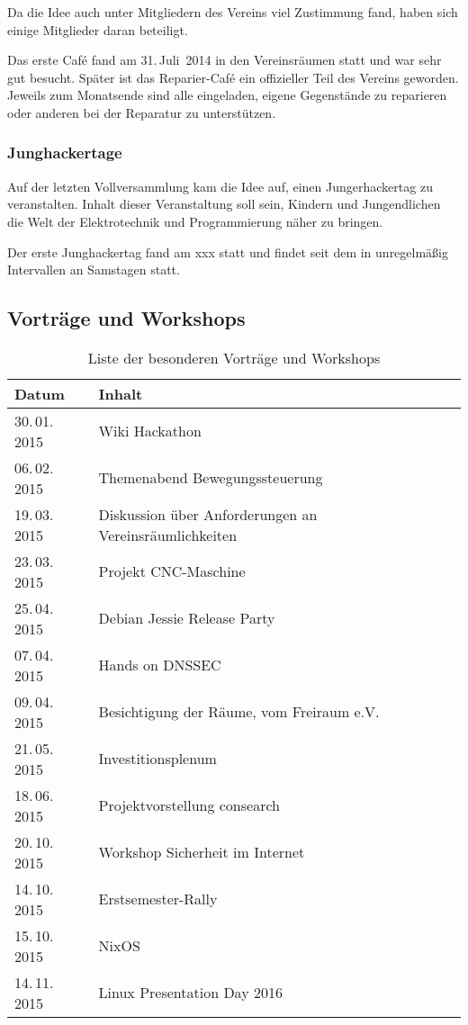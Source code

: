 \documentclass[ngerman]{scrartcl}
\begin{document}
Da die Idee auch unter Mitgliedern des Vereins viel Zustimmung fand,
haben sich einige Mitglieder daran beteiligt.

Das erste Café fand am 31.\,Juli~2014 in den Vereinsräumen statt und
war sehr gut besucht.  Später ist das Reparier-Café ein offizieller
Teil des Vereins geworden. Jeweils zum Monatsende sind alle
eingeladen, eigene Gegenstände zu reparieren oder anderen bei der
Reparatur zu unterstützen.

\subsubsection{Junghackertage}

Auf der letzten Vollversammlung kam die Idee auf, einen
Jungerhackertag zu veranstalten. Inhalt dieser Veranstaltung soll
sein, Kindern und Jungendlichen die Welt der Elektrotechnik und
Programmierung näher zu bringen.

Der erste Junghackertag fand am xxx statt und findet seit dem in
unregelmäßig Intervallen an Samstagen statt.


\subsection{Vorträge und Workshops}

\begin{table}[h]
  \centering{}
  \begin{tabularx}{\textwidth}{l|X}
	\textbf{Datum} & \textbf{Inhalt} \\ \midrule
	30.\,01.\,2015 & Wiki Hackathon \\
        06.\,02.\,2015 & Themenabend Bewegungssteuerung \\
	19.\,03.\,2015 & Diskussion über Anforderungen an Vereinsräumlichkeiten \\
	23.\,03.\,2015 & Projekt CNC-Maschine \\
	25.\,04.\,2015 & Debian Jessie Release Party \\
        07.\,04.\,2015 & Hands on DNSSEC \\
	09.\,04.\,2015 & Besichtigung der Räume, vom Freiraum e.V. \\
	21.\,05.\,2015 & Investitionsplenum \\
	18.\,06.\,2015 & Projektvorstellung consearch \\
	20.\,10.\,2015 & Workshop Sicherheit im Internet \\
	14.\,10.\,2015 & Erstsemester-Rally \\
        15.\,10.\,2015 & NixOS \\
	14.\,11.\,2015 & Linux Presentation Day 2016 \\
\bottomrule
	\end{tabularx}
	\caption{Liste der besonderen Vorträge und Workshops}
\end{table}
\end{document}
